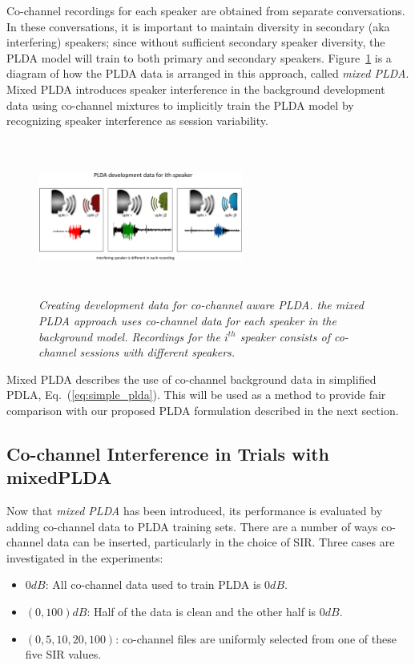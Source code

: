 Co-channel recordings for each speaker are obtained from separate conversations. In these conversations, it is important to maintain diversity in secondary (aka interfering) speakers; since without sufficient secondary speaker diversity, the PLDA model will train to both primary and secondary speakers. 
Figure~\ref{fig:mixedPLDA_diagram} is a diagram of how the PLDA data is arranged in this approach, called {\it mixed PLDA}. 
Mixed PLDA introduces speaker interference in the background development data using co-channel mixtures to implicitly train the PLDA model by recognizing speaker interference as session variability. 


\begin{figure}[t!]
	\centering
	\vspace{0mm}
	\includegraphics[width=0.6\textwidth, height=2in]{figures/mixedPLDA_slide-crop}
	\vspace{0mm}
	\caption{\it \small Creating development data for co-channel aware PLDA. the mixed PLDA approach uses co-channel data for each speaker in the background model. Recordings for the $i^{th}$ speaker consists of co-channel sessions with different speakers.}
	\label{fig:mixedPLDA_diagram}
	\vspace{-3mm}
\end{figure}

Mixed PLDA describes the use of co-channel background data in simplified PDLA, Eq.~(\ref{eq:simple_plda}). 
This will be used as a method to provide fair comparison with our proposed PLDA formulation described in the next section. 

\subsection{Co-channel Interference in Trials with mixedPLDA} 
\label{sssec:mixedplda_exp}

Now that {\it mixed PLDA} has been introduced, its performance is evaluated by adding co-channel data to PLDA training sets. 
There are a number of ways co-channel data can be inserted, particularly in the choice of SIR. 
Three cases are investigated in the experiments: 
\begin{itemize}
	\item $0dB$: All co-channel data used to train PLDA is $0dB$. 
	\item $(0,100)dB$: Half of the data is clean and the other half is $0dB$. 
	\item $(0,5,10,20,100)$: co-channel files are uniformly selected from one of these five SIR values. 
\end{itemize}

